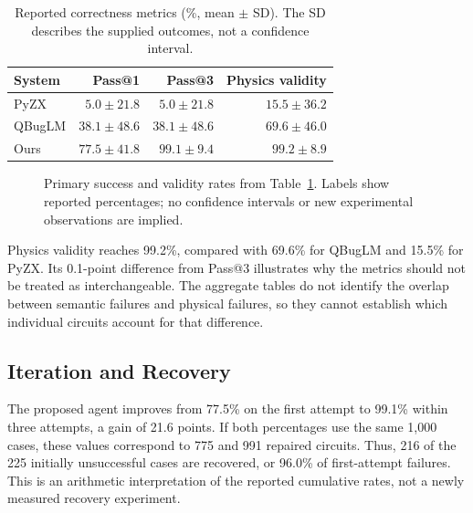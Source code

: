 \documentclass[conference]{IEEEtran}
\begin{document}
\begin{table}[t]
\caption{Reported correctness metrics (\%, mean $\pm$ SD). The SD describes the supplied outcomes, not a confidence interval.}
\label{tab:overall}
\centering\footnotesize
\begin{tabular}{@{}lrrr@{}}
\toprule
System & Pass@1 & Pass@3 & Physics validity\\
\midrule
PyZX & $5.0\pm21.8$ & $5.0\pm21.8$ & $15.5\pm36.2$\\
QBugLM & $38.1\pm48.6$ & $38.1\pm48.6$ & $69.6\pm46.0$\\
Ours & $77.5\pm41.8$ & $99.1\pm9.4$ & $99.2\pm8.9$\\
\bottomrule
\end{tabular}
\end{table}

\begin{figure}[t]
\centering
{}
\caption{Primary success and validity rates from Table~\ref{tab:overall}. Labels show reported percentages; no confidence intervals or new experimental observations are implied.}
\label{fig:performance}
\end{figure}

Physics validity reaches 99.2\%, compared with 69.6\% for QBugLM and 15.5\% for PyZX. Its 0.1-point difference from Pass@3 illustrates why the metrics should not be treated as interchangeable. The aggregate tables do not identify the overlap between semantic failures and physical failures, so they cannot establish which individual circuits account for that difference.

\subsection{Iteration and Recovery}
The proposed agent improves from 77.5\% on the first attempt to 99.1\% within three attempts, a gain of 21.6 points. If both percentages use the same 1,000 cases, these values correspond to 775 and 991 repaired circuits. Thus, 216 of the 225 initially unsuccessful cases are recovered, or 96.0\% of first-attempt failures. This is an arithmetic interpretation of the reported cumulative rates, not a newly measured recovery experiment.
\end{document}
